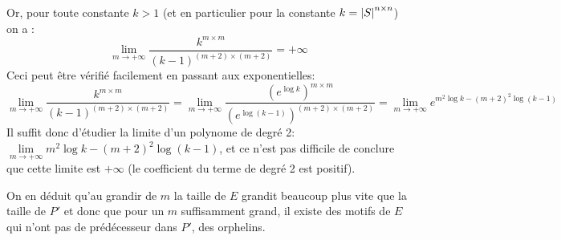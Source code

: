 \begin{proofI}
\begin{itemize}
		      Or, pour toute  constante $k > 1$ (et en particulier pour la constante $k=\left|S\right|  ^{n \times n}$) on a :
		      $$\lim\limits_{m \rightarrow +\infty} \frac{k^{m \times m }}{(k-1)^{(m + 2) \times (m + 2)}}= +\infty$$
		      Ceci peut être vérifié facilement en passant  aux exponentielles: 
		      $$\lim\limits_{m \rightarrow +\infty} \frac{k^{m \times m }}{(k-1)^{(m + 2) \times (m + 2)}}= 
		      \lim\limits_{m \rightarrow +\infty} \frac{(e^{\log k})^{m \times m }}{(e^{\log (k-1)})^{(m + 2) \times (m + 2)}}=
		      \lim\limits_{m \rightarrow +\infty} e^{m^2\log k - (m+2)^2\log (k-1)} $$
		      Il suffit donc d'étudier la limite d'un polynome de degré 2: 
		      $ \lim\limits_{m \rightarrow +\infty} m^2\log k - (m+2)^2\log (k-1)$,  et ce n'est pas difficile de conclure que cette 
		      limite est $+\infty$ (le coefficient du terme de degré 2 est positif).


			On en déduit qu'au grandir de $m$ la taille de $E$ grandit beaucoup plus vite que la taille de $P'$ 
			et donc  que pour un $m$ 
			suffisamment grand, il existe des motifs de $E$ qui n'ont pas de prédécesseur dans $P'$, \cad des orphelins.


		      
		    	\end{itemize}
\end{proofI}
